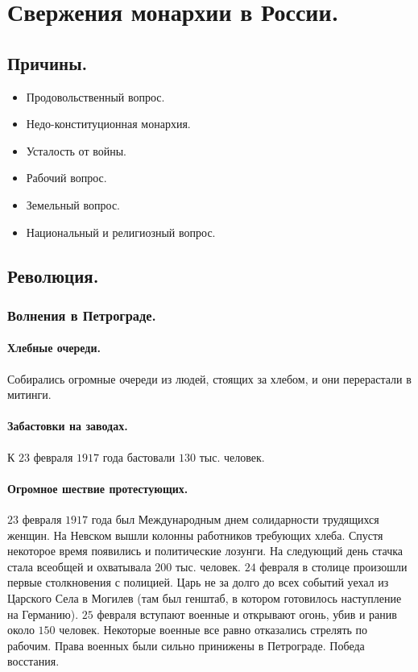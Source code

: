 \documentclass[12pt]{article}
\begin{document}
	\section{Свержения монархии в России.}
	\subsection{Причины.}
	\begin{itemize}
		\item Продовольственный вопрос.
		\item Недо-конституционная монархия.
		\item Усталость от войны.
		\item Рабочий вопрос.
		\item Земельный вопрос.
		\item Национальный и религиозный вопрос.
	\end{itemize}
	\subsection{Революция.}
	\subsubsection{Волнения в Петрограде.}
	\paragraph{Хлебные очереди.} Собирались огромные очереди из людей, стоящих за хлебом, и они перерастали в митинги.
	\paragraph{Забастовки на заводах.} К $23$ февраля $1917$ года бастовали $130$ тыс. человек.
	\paragraph{Огромное шествие протестующих.} $23$ февраля $1917$ года был Международным днем солидарности трудящихся женщин. На Невском вышли колонны работников требующих хлеба. Спустя некоторое время появились и политические лозунги. На следующий день стачка стала всеобщей и охватывала $200$ тыс. человек. $24$ февраля в столице произошли первые столкновения с полицией. Царь не за долго до всех событий уехал из Царского Села в Могилев (там был генштаб, в котором готовилось наступление на Германию). $25$ февраля вступают военные и открывают огонь, убив и ранив около $150$ человек. Некоторые военные все равно отказались стрелять по рабочим. Права военных были сильно принижены в Петрограде. Победа восстания.
\end{document}
